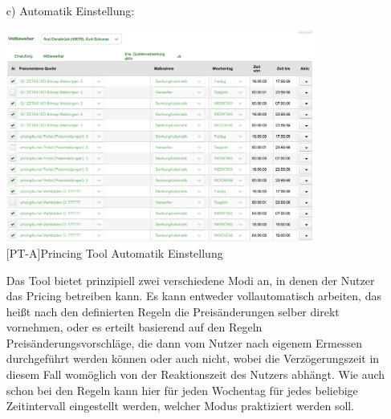 \documentclass[12pt,a4paper,bibliography=totocnumbered,listof=totocnumbered]{scrartcl}
\begin{document}
\begin{enumerate}
\item[c)] Automatik Einstellung:\\
\begin{center}
	\includegraphics[width=0.8\textwidth, draft]{Bilder/automatik.png}\\
	[PT-A]{Princing Tool Automatik Einstellung}
	\label{fig:PT-A}
\end{center}                                                                          
Das Tool bietet prinzipiell zwei verschiedene Modi an, in denen der Nutzer das Pricing betreiben kann. Es kann entweder vollautomatisch arbeiten, das heißt nach den definierten Regeln die Preisänderungen selber direkt vornehmen, oder es erteilt basierend auf den Regeln Preisänderungsvorschläge, die dann vom Nutzer nach eigenem Ermessen durchgeführt werden können oder auch nicht, wobei die Verzögerungszeit in diesem Fall womöglich von der Reaktionszeit des Nutzers abhängt. Wie auch schon bei den Regeln kann hier für jeden Wochentag für jedes beliebige Zeitintervall eingestellt werden, welcher Modus praktiziert werden soll.
\end{enumerate}




\end{document}
